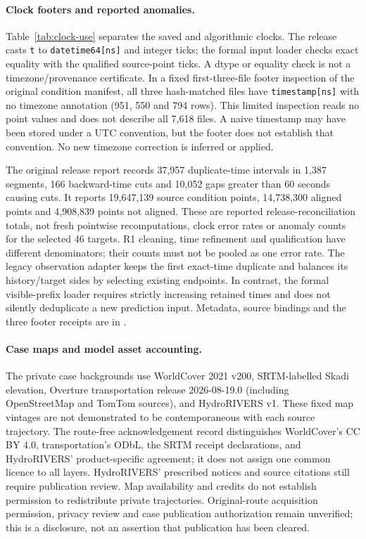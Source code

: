 \documentclass[11pt]{article}
\begin{document}
\paragraph{Clock footers and reported anomalies.}
Table~\ref{tab:clock-use} separates the saved and algorithmic clocks. The
release casts \texttt{t} to \texttt{datetime64[ns]} and integer ticks; the
formal input loader checks exact equality with the qualified source-point
ticks. A dtype or equality check is not a timezone/provenance certificate.
In a fixed first-three-file footer inspection of the original condition
manifest, all three hash-matched files have \texttt{timestamp[ns]} with no
timezone annotation (951, 550 and 794 rows). This limited inspection reads
no point values and does not describe all 7,618 files. A naive timestamp may
have been stored under a UTC convention, but the footer does not establish
that convention. No new timezone correction is inferred or applied.

The original release report records 37,957 duplicate-time intervals in
1,387 segments, 166 backward-time cuts and 10,052 gaps greater than 60
seconds causing cuts. It reports 19,647,139 source condition points,
14,738,300 aligned points and 4,908,839 points not aligned. These are
reported release-reconciliation totals, not fresh pointwise recomputations,
clock error rates or anomaly counts for the selected 46 targets. R1 cleaning,
time refinement and qualification have different denominators; their counts
must not be pooled as one error rate. The legacy observation adapter keeps the
first exact-time duplicate and balances its history/target sides by selecting
existing endpoints. In contrast, the formal visible-prefix loader requires
strictly increasing retained times and does not silently deduplicate a new
prediction input. Metadata, source bindings and the three footer receipts
are in .

\paragraph{Case maps and model asset accounting.}
The private case backgrounds use WorldCover 2021 v200\cite{worldcover2021},
SRTM-labelled Skadi elevation\cite{mapzenterrain}, Overture transportation release 2026-08-19.0
(including OpenStreetMap and TomTom sources)\cite{overture202608,overtureattribution}, and
HydroRIVERS v1\cite{hydrorivers2013,hydroriverslicense}.
These fixed map vintages are not demonstrated to be contemporaneous with
each source trajectory. The route-free acknowledgement record
 distinguishes
WorldCover's CC BY 4.0, transportation's ODbL, the SRTM receipt declarations,
and HydroRIVERS' product-specific agreement; it does not assign one common
licence to all layers. HydroRIVERS' prescribed notices and source citations
still require publication review. Map availability and credits do not
establish permission to redistribute private trajectories. Original-route
acquisition permission, privacy review and case publication authorization
remain unverified; this is a disclosure, not an assertion that publication
has been cleared.
\end{document}
